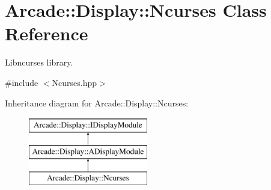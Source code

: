 \hypertarget{classArcade_1_1Display_1_1Ncurses}{}\section{Arcade\+::Display\+::Ncurses Class Reference}
\label{classArcade_1_1Display_1_1Ncurses}


Libncurses library.  




{\ttfamily \#include $<$Ncurses.\+hpp$>$}

Inheritance diagram for Arcade\+::Display\+::Ncurses\+:\begin{figure}[H]
\begin{center}
\leavevmode
\includegraphics[height=3.000000cm]{classArcade_1_1Display_1_1Ncurses}
\end{center}
\end{figure}
